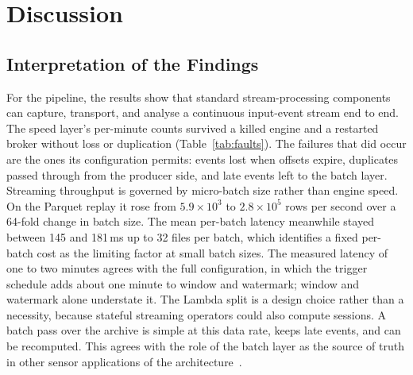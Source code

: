\documentclass[sensors,article,submit,pdftex,oneauthor]{Definitions/mdpi}
\begin{document}
\section{Discussion}
\label{sec:discussion}

\subsection{Interpretation of the Findings}
For the pipeline, the results show that standard stream-processing components can capture, transport, and analyse a continuous input-event stream end to end. The speed layer's per-minute counts survived a killed engine and a restarted broker without loss or duplication (Table~\ref{tab:faults}). The failures that did occur are the ones its configuration permits: events lost when offsets expire, duplicates passed through from the producer side, and late events left to the batch layer. Streaming throughput is governed by micro-batch size rather than engine speed. On the Parquet replay it rose from $5.9 \times 10^{3}$ to $2.8 \times 10^{5}$ rows per second over a 64-fold change in batch size. The mean per-batch latency meanwhile stayed between 145 and 181\,ms up to 32 files per batch, which identifies a fixed per-batch cost as the limiting factor at small batch sizes. The measured latency of one to two minutes agrees with the full configuration, in which the trigger schedule adds about one minute to window and watermark; window and watermark alone understate it. The Lambda split is a design choice rather than a necessity, because stateful streaming operators could also compute sessions. A batch pass over the archive is simple at this data rate, keeps late events, and can be recomputed. This agrees with the role of the batch layer as the source of truth in other sensor applications of the architecture~\cite{demirezen2023lambda, khattach2025iot}.
\end{document}
